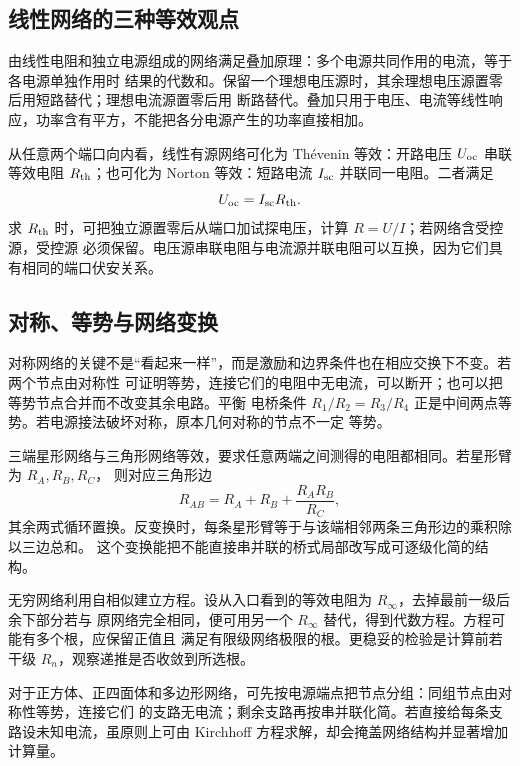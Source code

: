 \subsection*{线性网络的三种等效观点}

由线性电阻和独立电源组成的网络满足叠加原理：多个电源共同作用的电流，等于各电源单独作用时
结果的代数和。保留一个理想电压源时，其余理想电压源置零后用短路替代；理想电流源置零后用
断路替代。叠加只用于电压、电流等线性响应，功率含有平方，不能把各分电源产生的功率直接相加。

从任意两个端口向内看，线性有源网络可化为 Thévenin 等效：开路电压 $U_{\rm oc}$ 串联等效电阻
$R_{\rm th}$；也可化为 Norton 等效：短路电流 $I_{\rm sc}$ 并联同一电阻。二者满足
\[
 U_{\rm oc}=I_{\rm sc}R_{\rm th}.
\]
求 $R_{\rm th}$ 时，可把独立源置零后从端口加试探电压，计算 $R=U/I$；若网络含受控源，受控源
必须保留。电压源串联电阻与电流源并联电阻可以互换，因为它们具有相同的端口伏安关系。

\subsection*{对称、等势与网络变换}

对称网络的关键不是“看起来一样”，而是激励和边界条件也在相应交换下不变。若两个节点由对称性
可证明等势，连接它们的电阻中无电流，可以断开；也可以把等势节点合并而不改变其余电路。平衡
电桥条件 $R_1/R_2=R_3/R_4$ 正是中间两点等势。若电源接法破坏对称，原本几何对称的节点不一定
等势。

三端星形网络与三角形网络等效，要求任意两端之间测得的电阻都相同。若星形臂为 $R_A,R_B,R_C$，
则对应三角形边
\[
 R_{AB}=R_A+R_B+\frac{R_AR_B}{R_C},
\]
其余两式循环置换。反变换时，每条星形臂等于与该端相邻两条三角形边的乘积除以三边总和。
这个变换能把不能直接串并联的桥式局部改写成可逐级化简的结构。

无穷网络利用自相似建立方程。设从入口看到的等效电阻为 $R_\infty$，去掉最前一级后余下部分若与
原网络完全相同，便可用另一个 $R_\infty$ 替代，得到代数方程。方程可能有多个根，应保留正值且
满足有限级网络极限的根。更稳妥的检验是计算前若干级 $R_n$，观察递推是否收敛到所选根。

对于正方体、正四面体和多边形网络，可先按电源端点把节点分组：同组节点由对称性等势，连接它们
的支路无电流；剩余支路再按串并联化简。若直接给每条支路设未知电流，虽原则上可由 Kirchhoff
方程求解，却会掩盖网络结构并显著增加计算量。

